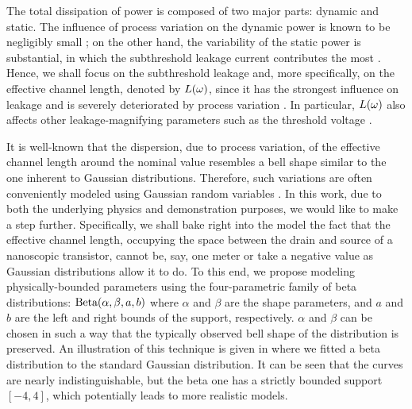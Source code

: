 The total dissipation of power is composed of two major parts: dynamic and static.
The influence of process variation on the dynamic power is known to be negligibly small \cite{srivastava2010, juan2011, juan2012}; on the other hand, the variability of the static power is substantial, in which the subthreshold leakage current contributes the most \cite{juan2011, juan2012}.
Hence, we shall focus on the subthreshold leakage and, more specifically, on the effective channel length, denoted by $L(\omega)$, since it has the strongest influence on leakage and is severely deteriorated by process variation \cite{chandrakasan2001}.
In particular, $L(\omega)$ also affects other leakage-magnifying parameters such as the threshold voltage \cite{juan2011}.

It is well-known that the dispersion, due to process variation, of the effective channel length around the nominal value resembles a bell shape similar to the one inherent to Gaussian distributions.
Therefore, such variations are often conveniently modeled using Gaussian random variables \cite{srivastava2010, juan2011, juan2012, chandra2010, shen2009, bhardwaj2006, ghanta2006}.
In this work, due to both the underlying physics and demonstration purposes, we would like to make a step further.
Specifically, we shall bake right into the model the fact that the effective channel length, occupying the space between the drain and source of a nanoscopic transistor, cannot be, say, one meter or take a negative value as Gaussian distributions allow it to do.
To this end, we propose modeling physically-bounded parameters using the four-parametric family of beta distributions: $\text{Beta}(\alpha, \beta, a, b)$ where $\alpha$ and $\beta$ are the shape parameters, and $a$ and $b$ are the left and right bounds of the support, respectively.
$\alpha$ and $\beta$ can be chosen in such a way that the typically observed bell shape of the distribution is preserved.
An illustration of this technique is given in  where we fitted a beta distribution to the standard Gaussian distribution.
It can be seen that the curves are nearly indistinguishable, but the beta one has a strictly bounded support $[-4, 4]$, which potentially leads to more realistic models.


